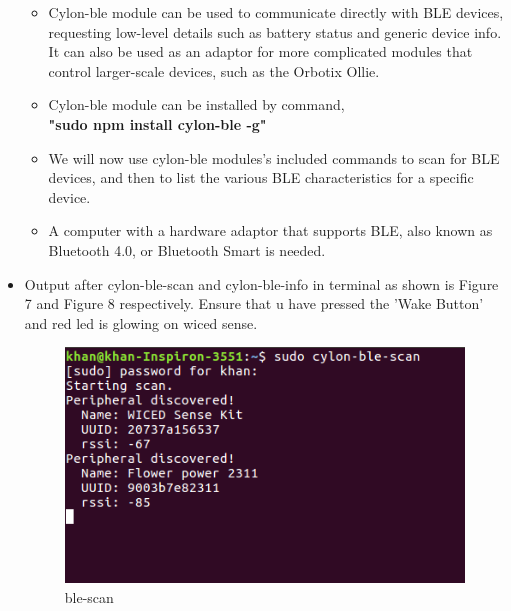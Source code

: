 \documentclass[11pt,a4paper]{article}
\begin{document}
\begin{itemize}
\begin{itemize}
\item Cylon-ble module can be used to communicate directly with BLE devices, requesting low-level details such as battery status and generic device info. It can also be used as an adaptor for more complicated modules that control larger-scale devices, such as the Orbotix Ollie.
\item Cylon-ble module can be installed by command,\\
\textbf{"sudo npm install cylon-ble -g"}
\item We will now use cylon-ble modules's included commands to scan for BLE devices, and then to list the various BLE characteristics for a specific device.
\item A computer with a hardware adaptor that supports BLE, also known as Bluetooth 4.0, or Bluetooth Smart is needed.
\end{itemize}
\newpage
\item Output after cylon-ble-scan and cylon-ble-info in terminal as shown is Figure 7 and Figure 8 respectively. Ensure that u have pressed the 'Wake Button' and red led is glowing on wiced sense.

\begin{figure}[h]
    \centering
	\includegraphics[scale=0.45]{blescan.png}
	\caption{ble-scan}
	\end{figure}


\end{itemize}
\end{document}
